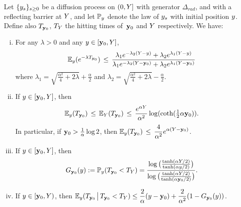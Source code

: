 \begin{lemma}\label{lemmaradial}
	Let $\{y_s\}_{s\geq 0}$ be a diffusion process on $(0,Y]$ with generator $\Delta_{rad}$, and with a reflecting barrier at $Y$, and let $\mathbb{P}_{y}$ denote the law of $y_s$ with initial position $y$. Define also $T_{{\bf y}_0}$, $T_Y$ the hitting times of~${\bf y}_0$ and $Y$ respectively. We have:
	\begin{enumerate}[(i)]
	\item\label{radial:itm:phi1} For any $\lambda>0$ and any $y\in[{\bf y}_0,Y]$,
	\begin{equation*}%
	\EE_{\auxy}(e^{-\lambda T_{\yabs_0}})\,\leq\,\frac{\lambda_1 e^{-\lambda_2 (\auxY-\auxy)}+\lambda_2 e^{\lambda_1(\auxY-\auxy)}}{{\lambda_1 e^{-\lambda_2 (\auxY-\yabs_0)}+\lambda_2 e^{\lambda_1(\auxY-\yabs_0)}}}\end{equation*}
	where $\lambda_1=\sqrt{\frac{\alpha^2}{4}+2\lambda}+\frac{\alpha}{2}$ and $\lambda_2=\sqrt{\frac{\alpha^2}{4}+2\lambda}-\frac{\alpha}{2}$.
	\item\label{radial:itm:phi2} If $y\in[{\bf y}_0,Y]$, then
	\[\mathbb{E}_{y}(T_{{\bf y}_0})\,\leq\,\mathbb{E}_{Y}(T_{{\bf y}_0})\,\leq\,\frac{e^{\alpha Y}}{\alpha^2}\log(\operatorname{coth}(\tfrac12\alpha {\bf y}_0)).\]
	In particular, if ${\bf y}_0>\tfrac{1}{\alpha}\log 2$, then 
	$\displaystyle
	\mathbb{E}_{y}(T_{{\bf y}_0})\,\leq\,\frac{4}{\alpha^2} e^{\alpha(Y-{\bf y}_0)}$.
	\item\label{radial:itm:phi3} If $y\in[{\bf y}_0,Y]$, then
	\[G_{{\bf y}_0}(y):=\mathbb{P}_{y}(T_{{\bf y}_0}<T_Y) = \frac{\log\big(\tfrac{\tanh(\alpha Y/2)}{\tanh(\alpha y/2)}\big)}{\log\big(\tfrac{\tanh(\alpha Y/2)}{\tanh(\alpha {\bf y}_0/2)}\big)}.
	\]
	\item\label{radial:itm:phi4} If  $y\in[{\bf y}_0,Y)$, then $\displaystyle
	\mathbb{E}_{y}(T_{{\bf y}_0}\,\big|\,T_{{\bf y}_0}<T_Y)\leq \frac{2}{\alpha}(y-{\bf y}_0)+\frac{2}{\alpha^2}(1-G_{{\bf y}_0}(y))$.
	\end{enumerate}
\end{lemma}
